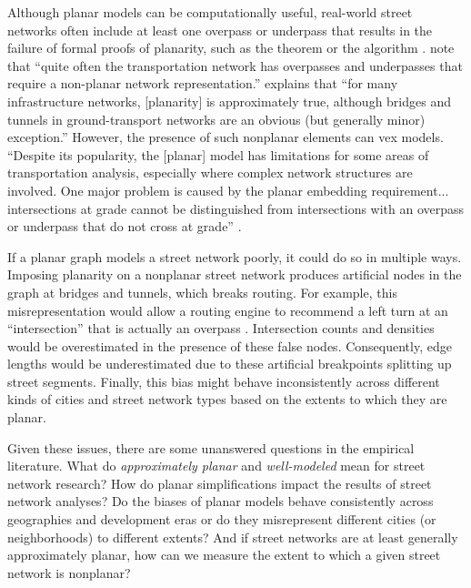 \documentclass[Afour,sageh,times]{sagej}
\begin{document}
Although planar models can be computationally useful, real-world street networks often include at least one overpass or underpass that results in the failure of formal proofs of planarity, such as the \citet{kuratowski_sur_1930} theorem or the \cite{hopcroft_efficient_1974} algorithm \citep[cf.][]{gastner_spatial_2006,levinson_network_2012}. \citet[p.~199]{jiang_object-oriented_2010} note that \enquote{quite often the transportation network has overpasses and underpasses that require a non-planar network representation.} \citet[p.~1258]{fischer_spatial_2014} explains that \enquote{for many infrastructure networks, {[planarity]} is approximately true, although bridges and tunnels in ground-transport networks are an obvious (but generally minor) exception.} However, the presence of such nonplanar elements can vex models. \enquote{Despite its popularity, the [planar] model has limitations for some areas of transportation analysis, especially where complex network structures are involved. One major problem is caused by the planar embedding requirement... intersections at grade cannot be distinguished from intersections with an overpass or underpass that do not cross at grade} \citep[p.~395]{fischer_gis_2004}.

If a planar graph models a street network poorly, it could do so in multiple ways. Imposing planarity on a nonplanar street network produces artificial nodes in the graph at bridges and tunnels, which breaks routing. For example, this misrepresentation would allow a routing engine to recommend a left turn at an \enquote{intersection} that is actually an overpass \citep[p.~6]{kwan_review_1996}. Intersection counts and densities would be overestimated in the presence of these false nodes. Consequently, edge lengths would be underestimated due to these artificial breakpoints splitting up street segments. Finally, this bias might behave inconsistently across different kinds of cities and street network types based on the extents to which they are planar.

Given these issues, there are some unanswered questions in the empirical literature. What do \emph{approximately planar} and \emph{well-modeled} mean for street network research? How do planar simplifications impact the results of street network analyses? Do the biases of planar models behave consistently across geographies and development eras or do they misrepresent different cities (or neighborhoods) to different extents? And if street networks are at least generally approximately planar, how can we measure the extent to which a given street network is nonplanar?
\end{document}
